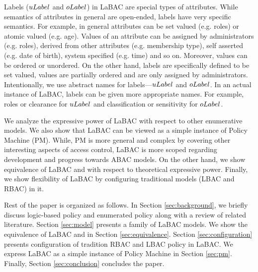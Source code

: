 Labels ($uLabel$ and $oLabel$) in LaBAC are special types of attributes. While semantics of attributes in general are open-ended, labels have very specific semantics. For example, in general attributes can be set valued (e.g. roles) or atomic valued (e.g. age). Values of an attribute can be assigned by administrators (e.g. roles), derived from other attributes (e.g. membership type), self asserted (e.g. date of birth),  system specified (e.g. time) and so on. Moreover, values can be ordered or unordered.  On the other  hand, labels are specifically defined to be set valued, values are partially ordered and are only assigned by administrators. Intentionally, we use abstract names for labels---$uLabel$ and $oLabel$.  In an actual instance of LaBAC, labels can be given more appropriate names. For example, roles or clearance for $uLabel$ and classification or sensitivity for $oLabel$.


We analyze the expressive power of LaBAC with respect to other enumerative models. We also show that LaBAC can be viewed as a simple instance of Policy Machine (PM).  While, PM is more general and complex by covering other interesting aspects of access control, LaBAC is more scoped regarding development and progress towards ABAC models. On the other hand, we show equivalence of LaBAC and \twoSortedRBAC{} with respect to theoretical expressive power. Finally, we show flexibility of LaBAC by configuring traditional models (LBAC \cite{lbac} and RBAC\cite{rbac}) in it.

Rest of the paper is organized as follows. In Section \ref{sec:background}, we briefly discuss logic-based policy and enumerated policy along with a review of related literature. Section \ref{sec:model} presents a family of LaBAC models. We show the equivalence of LaBAC and \twoSortedRBAC{} in Section \ref{sec:equivalence}. Section \ref{sec:configuration} presents configuration of tradition RBAC and LBAC policy in LaBAC. We express LaBAC as a simple instance of Policy Machine in Section \ref{sec:pm}. Finally, Section \ref{sec:conclusion} concludes the paper.

